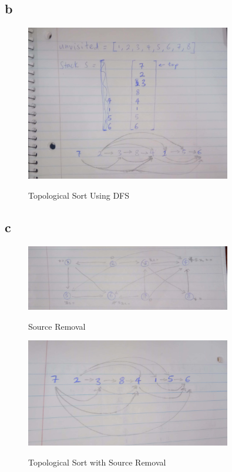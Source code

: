 \documentclass{article}
\begin{document}
\subsection*{b}
\begin{figure}[h]
    \centering
    \includegraphics[width=0.8\textwidth]{tobosort23feb.jpg}
    \label{fig:topological-sort-using-dfs}
    \caption{Topological Sort Using DFS}
\end{figure}
\newpage
\subsection*{c}
\begin{figure}
    \centering
    \includegraphics[width=0.8\textwidth]{sourceremoval.jpg}
    \label{fig:source-removal}
    \caption{Source Removal}
\end{figure}

\begin{figure}
    \centering
    \includegraphics[width=0.8\textwidth]{tobosort23febsourcerenoval.jpg}
    \label{fig:topological-sort-source-removal}
    \caption{Topological Sort with Source Removal}
\end{figure}
\end{document}
